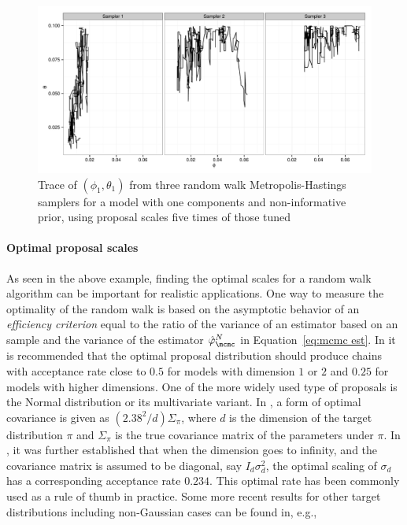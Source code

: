 \begin{figure}
  \includegraphics[width=\linewidth]{fig/PET_MH_H_Path.pdf}
  \caption[Trace of parameters in the random walk algorithm for the
  \protect\pet compartmental model (uncalibrated)]
  {Trace of $(\phi_1,\theta_1)$ from three random walk
    Metropolis-Hastings samplers for a \pet model with one components and
    non-informative prior, using proposal scales five times of those tuned}
  \label{fig:pet mh untuned}
\end{figure}

\paragraph{Optimal proposal scales}

As seen in the above example, finding the optimal scales for a random walk
algorithm can be important for realistic applications. One way to measure the
optimality of the random walk is based on the asymptotic behavior of an
\emph{efficiency criterion} equal to the ratio of the variance of an estimator
based on an \iid sample and the variance of the estimator
$\hat\varphi_{\mcmc}^N$ in Equation~\eqref{eq:mcmc est}. In
\cite{Roberts:1997dg} it is recommended that the optimal proposal distribution
should produce chains with acceptance rate close to $0.5$ for models with
dimension $1$ or $2$ and $0.25$ for models with higher dimensions. One of the
more widely used type of proposals is the Normal distribution or its
multivariate variant. In \cite{Gelman:1995vx}, a form of optimal covariance is
given as $(2.38^2/d)\Sigma_{\pi}$, where $d$ is the dimension of the target
distribution $\pi$ and $\Sigma_{\pi}$ is the true covariance matrix of the
parameters under $\pi$. In \cite{Roberts:2001ta}, it was further established
that when the dimension goes to infinity, and the covariance matrix is assumed
to be diagonal, say $I_d\sigma_d^2$, the optimal scaling of $\sigma_d$ has a
corresponding acceptance rate $0.234$. This optimal rate has been commonly
used as a rule of thumb in practice. Some more recent results for other target
distributions including non-Gaussian cases can be found in, e.g.,
\cite{Chris:2009vx,Peter:2011vx}

